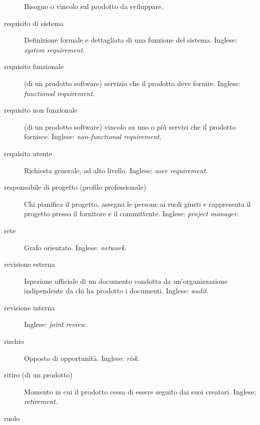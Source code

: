 \documentclass[a4paper]{article}
\begin{document}
\begin{description}
			Bisogno o vincolo sul prodotto da sviluppare.
			
	\item[requisito di sistema] 

			Definizione formale e dettagliata di una funzione del sistema. Inglese: \emph{system requirement}.
			
	\item[requisito funzionale] 

			(di un prodotto software) servizio che il prodotto deve fornire. Inglese: \emph{functional requirement}.
			
	\item[requisito non funzionale] 

			(di un prodotto software) vincolo su uno o più servizi che il prodotto fornisce. Inglese: \emph{non-functional requirement}.
			
	\item[requisito utente] 

			Richiesta generale, ad alto livello. Inglese: \emph{user requirement}.
			
	\item[responsabile di progetto (profilo professionale)] 

			Chi pianifica il progetto, assegna le persone ai ruoli giusti e rappresenta il progetto presso il fornitore e il committente. Inglese: \emph{project manager}.
			
	\item[rete] 

			Grafo orientato. Inglese: \emph{network}.
			
	\item[revisione esterna] 

			Ispezione ufficiale di un documento condotta da un'organizzazione indipendente da chi ha prodotto i documenti. Inglese: \emph{audit}.
			
	\item[revisione interna] 

			 Inglese: \emph{joint review}.
			
	\item[rischio] 

			Opposto di opportunità. Inglese: \emph{risk}.
			
	\item[ritiro (di un prodotto)] 

			Momento in cui il prodotto cessa di essere seguito dai suoi creatori. Inglese: \emph{retirement}.
			
	\item[ruolo] 


\end{description}
\end{document}
